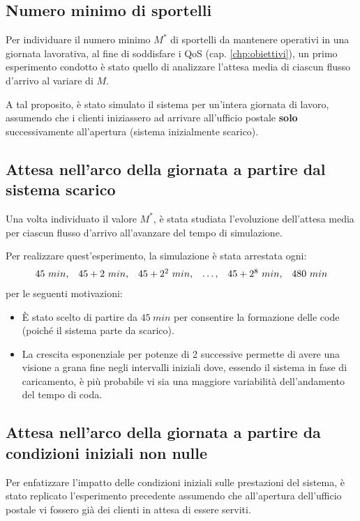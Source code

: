 \subsection*{Numero minimo di sportelli}
Per individuare il numero minimo $M^*$ di sportelli da mantenere operativi in una giornata lavorativa, al fine di soddisfare i QoS (cap. \ref{chp:obiettivi}), un primo esperimento condotto è stato quello di analizzare l'attesa media di ciascun flusso d'arrivo al variare di $M$.

A tal proposito, è stato simulato il sistema per un'intera giornata di lavoro, assumendo che i clienti iniziassero ad arrivare all'ufficio postale \textbf{solo} successivamente all'apertura (sistema inizialmente scarico).

\subsection*{Attesa nell'arco della giornata a partire dal sistema scarico}
Una volta individuato il valore $M^*$, è stata studiata l'evoluzione dell'attesa media per ciascun flusso d'arrivo all'avanzare del tempo di simulazione.

Per realizzare quest'esperimento, la simulazione è stata arrestata ogni:
\begin{equation}
\begin{array}{l l l l l l}
45\ min, & 45 + 2\ min, & 45 + 2^2\ min, & \dots, & 45 + 2^8\ min, & 480\ min
\end{array}
\end{equation}
per le seguenti motivazioni:
\begin{itemize}
\item È stato scelto di partire da $45\ min$ per consentire la formazione delle code (poiché il sistema parte da scarico).
\item La crescita esponenziale per potenze di 2 successive permette di avere una visione a grana fine negli intervalli iniziali dove, essendo il sistema in fase di caricamento, è più probabile vi sia una maggiore variabilità dell'andamento del tempo di coda. 
\end{itemize}

\subsection*{Attesa nell'arco della giornata a partire da condizioni iniziali non nulle}
Per enfatizzare l'impatto delle condizioni iniziali sulle prestazioni del sistema, è stato replicato l'esperimento precedente assumendo che all'apertura dell'ufficio postale vi fossero già dei clienti in attesa di essere serviti.

